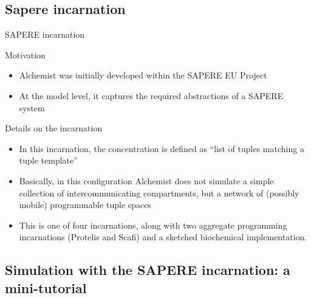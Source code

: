 \documentclass[presentation]{beamer}
\begin{document}
%
\subsection{Sapere incarnation}
\begin{frame}{SAPERE incarnation}
 \begin{block}{Motivation}
  \begin{itemize}
   \item Alchemist was initially developed within the SAPERE EU Project
   \item At the model level, it captures the required abstractions of a SAPERE system
  \end{itemize}
 \end{block}
 \begin{block}{Details on the incarnation}
  \begin{itemize}
   \item In this incarnation, the concentration is defined as ``list of tuples matching a tuple template''
   \item Basically, in this configuration Alchemist does not simulate a simple collection of intercommunicating compartments, but a network of (possibly mobile) programmable tuple spaces
   \item This is one of four incarnations, along with two aggregate programming incarnations (Protelis and Scafi) and a sketched biochemical implementation.
  \end{itemize}
 \end{block}
\end{frame}

\subsection{Simulation with the SAPERE incarnation: a mini-tutorial}
\end{document}
